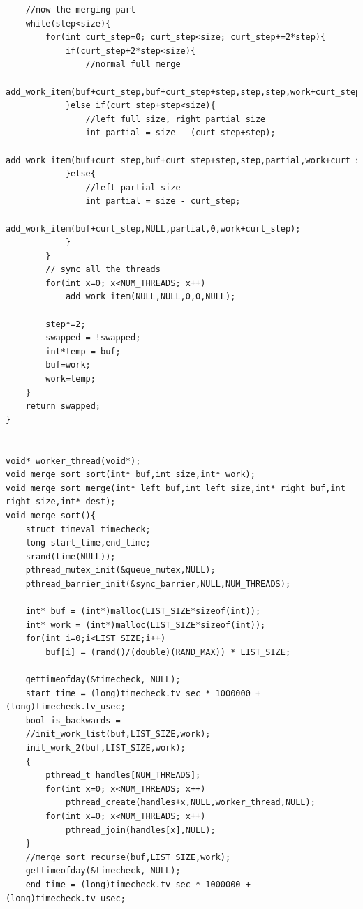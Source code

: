 \documentclass[12pt]{article}
\begin{document}
\begin{verbatim}
	//now the merging part
	while(step<size){
		for(int curt_step=0; curt_step<size; curt_step+=2*step){
			if(curt_step+2*step<size){
				//normal full merge
				add_work_item(buf+curt_step,buf+curt_step+step,step,step,work+curt_step);
			}else if(curt_step+step<size){
				//left full size, right partial size
				int partial = size - (curt_step+step);
				add_work_item(buf+curt_step,buf+curt_step+step,step,partial,work+curt_step);
			}else{
				//left partial size
				int partial = size - curt_step;
				add_work_item(buf+curt_step,NULL,partial,0,work+curt_step);
			}
		}
		// sync all the threads
		for(int x=0; x<NUM_THREADS; x++)
			add_work_item(NULL,NULL,0,0,NULL);
		
		step*=2;
		swapped = !swapped;
		int*temp = buf;
		buf=work;
		work=temp;
	}
	return swapped;
}


void* worker_thread(void*);
void merge_sort_sort(int* buf,int size,int* work);
void merge_sort_merge(int* left_buf,int left_size,int* right_buf,int right_size,int* dest);
void merge_sort(){
	struct timeval timecheck;
	long start_time,end_time;
	srand(time(NULL));
	pthread_mutex_init(&queue_mutex,NULL);
	pthread_barrier_init(&sync_barrier,NULL,NUM_THREADS);

	int* buf = (int*)malloc(LIST_SIZE*sizeof(int));
	int* work = (int*)malloc(LIST_SIZE*sizeof(int));
	for(int i=0;i<LIST_SIZE;i++)
		buf[i] = (rand()/(double)(RAND_MAX)) * LIST_SIZE;

	gettimeofday(&timecheck, NULL);
	start_time = (long)timecheck.tv_sec * 1000000 + (long)timecheck.tv_usec;
	bool is_backwards =
	//init_work_list(buf,LIST_SIZE,work);
	init_work_2(buf,LIST_SIZE,work);
	{
		pthread_t handles[NUM_THREADS];
		for(int x=0; x<NUM_THREADS; x++)
			pthread_create(handles+x,NULL,worker_thread,NULL);
		for(int x=0; x<NUM_THREADS; x++)
			pthread_join(handles[x],NULL);
	}
	//merge_sort_recurse(buf,LIST_SIZE,work);
	gettimeofday(&timecheck, NULL);
	end_time = (long)timecheck.tv_sec * 1000000 + (long)timecheck.tv_usec;


\end{verbatim}
\end{document}
